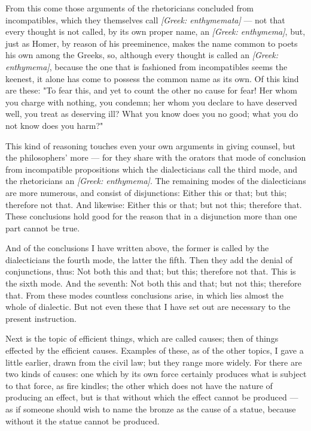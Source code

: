  From this come those arguments of the rhetoricians concluded from incompatibles, which they themselves call \textit{[Greek: enthymemata]} — not that every thought is not called, by its own proper name, an \textit{[Greek: enthymema]}, but, just as Homer, by reason of his preeminence, makes the name common to poets his own among the Greeks, so, although every thought is called an \textit{[Greek: enthymema]}, because the one that is fashioned from incompatibles seems the keenest, it alone has come to possess the common name as its own. Of this kind are these: "To fear this, and yet to count the other no cause for fear! Her whom you charge with nothing, you condemn; her whom you declare to have deserved well, you treat as deserving ill? What you know does you no good; what you do not know does you harm?"

 This kind of reasoning touches even your own arguments in giving counsel, but the philosophers' more — for they share with the orators that mode of conclusion from incompatible propositions which the dialecticians call the third mode, and the rhetoricians an \textit{[Greek: enthymema]}. The remaining modes of the dialecticians are more numerous, and consist of disjunctions: Either this or that; but this; therefore not that. And likewise: Either this or that; but not this; therefore that. These conclusions hold good for the reason that in a disjunction more than one part cannot be true.

 And of the conclusions I have written above, the former is called by the dialecticians the fourth mode, the latter the fifth. Then they add the denial of conjunctions, thus: Not both this and that; but this; therefore not that. This is the sixth mode. And the seventh: Not both this and that; but not this; therefore that. From these modes countless conclusions arise, in which lies almost the whole of dialectic. But not even these that I have set out are necessary to the present instruction.

 Next is the topic of efficient things, which are called causes; then of things effected by the efficient causes. Examples of these, as of the other topics, I gave a little earlier, drawn from the civil law; but they range more widely. For there are two kinds of causes: one which by its own force certainly produces what is subject to that force, as fire kindles; the other which does not have the nature of producing an effect, but is that without which the effect cannot be produced — as if someone should wish to name the bronze as the cause of a statue, because without it the statue cannot be produced.

